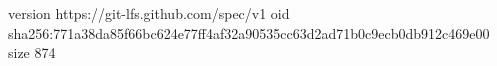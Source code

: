 version https://git-lfs.github.com/spec/v1
oid sha256:771a38da85f66bc624e77ff4af32a90535cc63d2ad71b0c9ecb0db912c469e00
size 874
